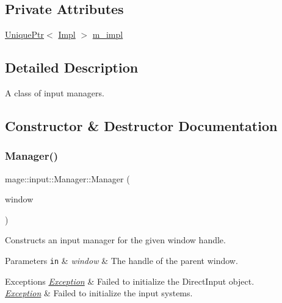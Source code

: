 \subsection*{Private Attributes}
\begin{DoxyCompactItemize}
\item 
\hyperlink{namespacemage_a3316d7143a973e37adf1110f2e80ca31}{Unique\+Ptr}$<$ \hyperlink{classmage_1_1input_1_1_manager_1_1_impl}{Impl} $>$ \hyperlink{classmage_1_1input_1_1_manager_ae404d608b787f264c0d5e8cf24aacf98}{m\+\_\+impl}
\end{DoxyCompactItemize}


\subsection{Detailed Description}
A class of input managers. 

\subsection{Constructor \& Destructor Documentation}
\hypertarget{classmage_1_1input_1_1_manager_a58ecd18389d84fb46109f3b28d105879}{}\label{classmage_1_1input_1_1_manager_a58ecd18389d84fb46109f3b28d105879} 
\subsubsection{\texorpdfstring{Manager()}{Manager()}\hspace{0.1cm}{\footnotesize\ttfamily [1/3]}}
{\footnotesize\ttfamily mage\+::input\+::\+Manager\+::\+Manager (\begin{DoxyParamCaption}\item[{\hyperlink{namespacemage_a8769f9d670d6b585ea306cb1062af94b}{Not\+Null}$<$ H\+W\+ND $>$}]{window }\end{DoxyParamCaption})\hspace{0.3cm}{\ttfamily [explicit]}}

Constructs an input manager for the given window handle.


\begin{DoxyParams}[1]{Parameters}
\mbox{\tt in}  & {\em window} & The handle of the parent window. \\
\hline
\end{DoxyParams}

\begin{DoxyExceptions}{Exceptions}
{\em \hyperlink{classmage_1_1_exception}{Exception}} & Failed to initialize the Direct\+Input object. \\
\hline
{\em \hyperlink{classmage_1_1_exception}{Exception}} & Failed to initialize the input systems. \\
\hline
\end{DoxyExceptions}
\hypertarget{classmage_1_1input_1_1_manager_a345b3b9384e5a3f31ff183e5208fa56b}{}\label{classmage_1_1input_1_1_manager_a345b3b9384e5a3f31ff183e5208fa56b} 
